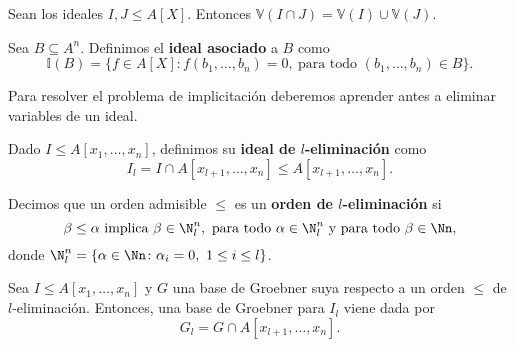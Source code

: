 \begin{proposicion}
    Sean los ideales $I,J\le A[X]$. Entonces  $\mathbb{V}(I \cap J) = \mathbb{V}(I) \cup \mathbb{V}(J)$.
\end{proposicion}
\begin{definicion}
    Sea $B\subseteq A^n$. Definimos el \textbf{ideal asociado} a $B$ como
    \begin{equation*}
        \mathbb{I}(B) = \{f\in A[X] : f(b_1,\dots, b_n) = 0,\ \text{para todo } (b_1,\dots, b_n)\in B\}.
    \end{equation*}
\end{definicion}

Para resolver el problema de implicitación deberemos aprender antes a eliminar variables de un ideal.
\begin{definicion}
    Dado $I\le A[x_1,\dots,x_n]$, definimos su \textbf{ideal de $l$-eliminación} como
    \begin{equation*}
        I_l = I \cap A[x_{l+1}, \dots, x_n] \le A[x_{l+1}, \dots, x_n].
    \end{equation*}
\end{definicion}

\begin{definicion}
    Decimos que un orden admisible $\le$ es un \textbf{orden de $l$-eliminación} si 
    $$\beta\le \alpha \text{ implica } \beta \in \N_l^n,\ \text{para todo } \alpha \in \N_l^n \text{ y } \text{para todo } \beta \in \Nn,$$
    donde $\N_l^n = \{\alpha\in \Nn \colon \alpha_i =0,\ 1\le i \le l\}$.
\end{definicion}

\begin{teorema}[Eliminación]
    Sea $I\le A[x_1,\dots,x_n]$ y $G$ una base de Groebner suya respecto a un orden $\le$ de $l$-eliminación. Entonces, una base de Groebner para $I_l$ viene dada por
    \begin{equation*}
        G_l = G\cap A[x_{l+1},\dots, x_n].
    \end{equation*}
\end{teorema}


